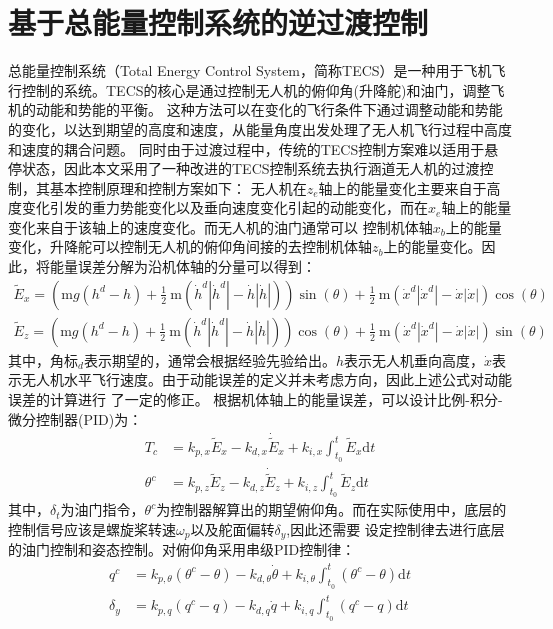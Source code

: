 \section{基于总能量控制系统的逆过渡控制}
总能量控制系统（Total Energy Control System，简称TECS）是一种用于飞机飞行控制的系统。TECS的核心是通过控制无人机的俯仰角(升降舵)和油门，调整飞机的动能和势能的平衡。
这种方法可以在变化的飞行条件下通过调整动能和势能的变化，以达到期望的高度和速度，从能量角度出发处理了无人机飞行过程中高度和速度的耦合问题。
同时由于过渡过程中，传统的TECS控制方案难以适用于悬停状态，因此本文采用了一种改进的TECS控制系统\cite{argyle2016modeling}去执行涵道无人机的过渡控制，其基本控制原理和控制方案如下：
无人机在$z_{e}$轴上的能量变化主要来自于高度变化引发的重力势能变化以及垂向速度变化引起的动能变化，而在$x_{e}$轴上的能量变化来自于该轴上的速度变化。而无人机的油门通常可以
控制机体轴$x_{b}$上的能量变化，升降舵可以控制无人机的俯仰角间接的去控制机体轴$z_{b}$上的能量变化。因此，将能量误差分解为沿机体轴的分量可以得到\cite{argyle2016modeling}：
\begin{align}
    \tilde{E}_{x}=\left(\mathrm{m} g\left(h^{d}-h\right)+\frac{1}{2} \mathrm{~m}\left(\dot{h}^{d}\left|\dot{h}^{d}\right|-\dot{h}|\dot{h}|\right)\right) \sin (\theta)+\frac{1}{2} \mathrm{~m}\left(\dot{x}^{d}\left|\dot{x}^{d}\right|-\dot{x}|\dot{x}|\right) \cos (\theta) \\
    \tilde{E}_{z}=\left(\mathrm{m} g\left(h^{d}-h\right)+\frac{1}{2} \mathrm{~m}\left(\dot{h}^{d}\left|\dot{h}^{d}\right|-\dot{h}|\dot{h}|\right)\right) \cos (\theta)+\frac{1}{2} \mathrm{~m}\left(\dot{x}^{d}\left|\dot{x}^{d}\right|-\dot{x}|\dot{x}|\right) \sin (\theta)
\end{align}
其中，角标$_{d}$表示期望的，通常会根据经验先验给出。$h$表示无人机垂向高度，$\dot{x}$表示无人机水平飞行速度。由于动能误差的定义并未考虑方向，因此上述公式对动能误差的计算进行
了一定的修正。
根据机体轴上的能量误差，可以设计比例-积分-微分控制器(PID)为：
\begin{align}
    T_{c} & = k_{p, x} \tilde{E}_{x}-k_{d, x} \dot{\tilde{E}}_{x}+k_{i, x} \int_{t_{0}}^{t} \tilde{E}_{x} \mathrm{d}t \\
    \theta^{c} & = k_{p, z} \tilde{E}_{z}-k_{d, z} \dot{\tilde{E}}_{z}+k_{i, z} \int_{t_{0}}^{t} \tilde{E}_{z} \mathrm{d}t
\end{align}
其中，$\delta_{t}$为油门指令，$\theta^{c}$为控制器解算出的期望俯仰角。而在实际使用中，底层的控制信号应该是螺旋桨转速$\omega_{p}$以及舵面偏转$\delta_{y}$,因此还需要
设定控制律去进行底层的油门控制和姿态控制。对俯仰角采用串级PID控制律：
\begin{align}
    q^{c} & = k_{p, \theta}\left(\theta^{c}-\theta\right)-k_{d, \theta} \dot{\theta} +k_{i, \theta} \int_{t_{0}}^{t}\left(\theta^{c}-\theta\right) \mathrm{d}t\\
    \delta_{y}&= k_{p, q}\left(q^{c}-q\right)-k_{d, q} \dot{q} +k_{i, q} \int_{t_{0}}^{t}\left(q^{c}-q\right) \mathrm{d}t
\end{align}
